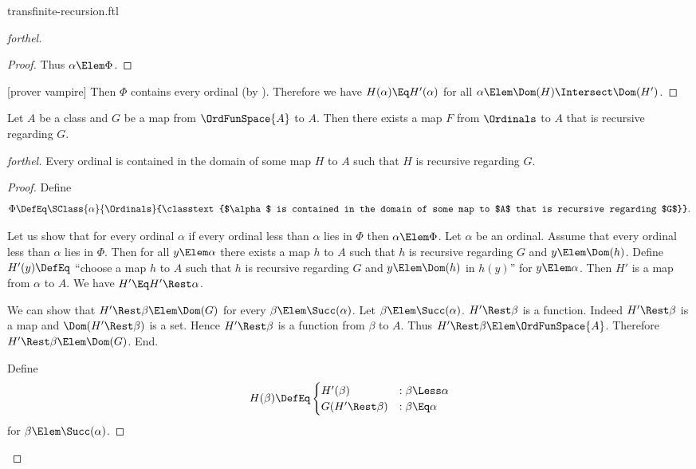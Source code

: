 \documentclass{stex}
\begin{document}
\begin{smodule}{transfinite-recursion.ftl}
\begin{proof}[forthel]
\begin{proof}
    Thus $\alpha \Elem \Phi$.
  \end{proof}

  [prover vampire]
  Then $\Phi$ contains every ordinal (by ).
  Therefore we have $H(\alpha) \Eq H'(\alpha)$ for all $\alpha \Elem \Dom(H) \Intersect \Dom(H')$.
\end{proof}

\begin{theorem}[forthel,title=Transfinite Recursion: Existence]
  Let $A$ be a class and $G$ be a map from $\OrdFunSpace{A}$ to $A$.
  Then there exists a map $F$ from $\Ordinals$ to $A$ that is recursive regarding $G$.
\end{theorem}
\begin{proof}[forthel]
  Every ordinal is contained in the domain of some map $H$ to $A$ such that $H$ is recursive regarding $G$.
  \begin{proof}
    Define \[ \Phi \DefEq \SClass{\alpha}{\Ordinals}{\classtext{$\alpha$ is contained in the domain of some map to $A$ that is recursive regarding $G$}}. \]

    Let us show that for every ordinal $\alpha$ if every ordinal less than $\alpha$ lies in $\Phi$ then $\alpha \Elem \Phi$.
      Let $\alpha$ be an ordinal.
      Assume that every ordinal less than $\alpha$ lies in $\Phi$.
      Then for all $y \Elem \alpha$ there exists a map $h$ to $A$ such that $h$ is recursive regarding $G$ and $y \Elem \Dom(h)$.
      Define $H'(y) \DefEq$ ``choose a map $h$ to $A$ such that $h$ is recursive regarding $G$ and $y \Elem \Dom(h)$ in $h(y)$'' for $y \Elem \alpha$.
      Then $H'$ is a map from $\alpha$ to $A$.
      We have $H' \Eq H' \Rest \alpha$.

      We can show that $H' \Rest \beta \Elem \Dom(G)$ for every $\beta \Elem \Succ(\alpha)$.
        Let $\beta \Elem \Succ(\alpha)$.
        $H' \Rest \beta$ is a function.
        Indeed $H' \Rest \beta$ is a map and $\Dom(H' \Rest \beta)$ is a set.
        Hence $H' \Rest \beta$ is a function from $\beta$ to $A$.
        Thus $H' \Rest \beta \Elem \OrdFunSpace{A}$.
        Therefore  $H' \Rest \beta \Elem \Dom(G)$.
      End.

      Define \[ H(\beta) \DefEq
        \begin{cases}
          H'(\beta)             & : \beta \Less \alpha \\
          G(H' \Rest \beta)  & : \beta \Eq \alpha
        \end{cases} \]
      for $\beta \Elem \Succ(\alpha)$.
      

\end{proof}
\end{proof}
\end{smodule}
\end{document}
